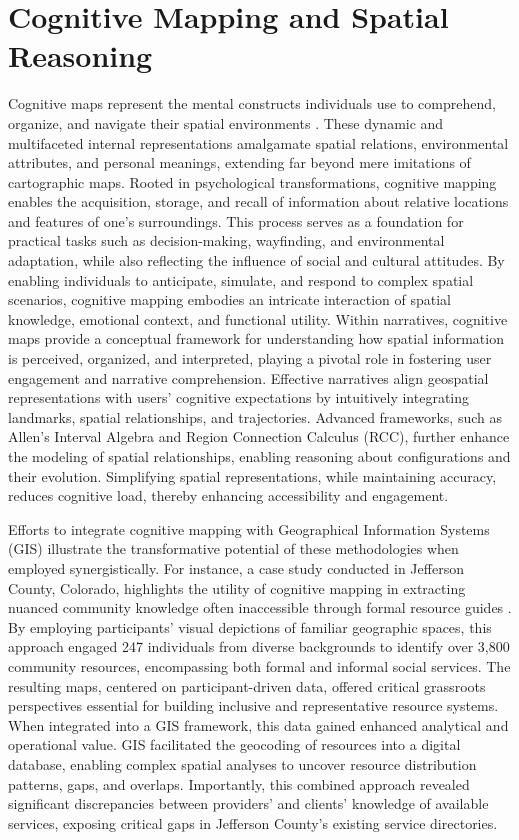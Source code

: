 \section{Cognitive Mapping and Spatial Reasoning}\label{III-subsec:cognitive_mapping}
Cognitive maps represent the mental constructs individuals use to comprehend, organize, and navigate their spatial environments \cite{kitchinCognitiveMapsWhat1994}. These dynamic and multifaceted internal representations amalgamate spatial relations, environmental attributes, and personal meanings, extending far beyond mere imitations of cartographic maps. Rooted in psychological transformations, cognitive mapping enables the acquisition, storage, and recall of information about relative locations and features of one's surroundings. This process serves as a foundation for practical tasks such as decision-making, wayfinding, and environmental adaptation, while also reflecting the influence of social and cultural attitudes. By enabling individuals to anticipate, simulate, and respond to complex spatial scenarios, cognitive mapping embodies an intricate interaction of spatial knowledge, emotional context, and functional utility. Within narratives, cognitive maps provide a conceptual framework for understanding how spatial information is perceived, organized, and interpreted, playing a pivotal role in fostering user engagement and narrative comprehension. Effective narratives align geospatial representations with users’ cognitive expectations by intuitively integrating landmarks, spatial relationships, and trajectories. Advanced frameworks, such as Allen's Interval Algebra and Region Connection Calculus (RCC), further enhance the modeling of spatial relationships, enabling reasoning about configurations and their evolution. Simplifying spatial representations, while maintaining accuracy, reduces cognitive load, thereby enhancing accessibility and engagement.

Efforts to integrate cognitive mapping with Geographical Information Systems (GIS) illustrate the transformative potential of these methodologies when employed synergistically. For instance, a case study conducted in Jefferson County, Colorado, highlights the utility of cognitive mapping in extracting nuanced community knowledge often inaccessible through formal resource guides \cite{kathleneCognitiveMappingGIS2007}. By employing participants’ visual depictions of familiar geographic spaces, this approach engaged 247 individuals from diverse backgrounds to identify over 3,800 community resources, encompassing both formal and informal social services. The resulting maps, centered on participant-driven data, offered critical grassroots perspectives essential for building inclusive and representative resource systems. When integrated into a GIS framework, this data gained enhanced analytical and operational value. GIS facilitated the geocoding of resources into a digital database, enabling complex spatial analyses to uncover resource distribution patterns, gaps, and overlaps. Importantly, this combined approach revealed significant discrepancies between providers’ and clients’ knowledge of available services, exposing critical gaps in Jefferson County's existing service directories.

